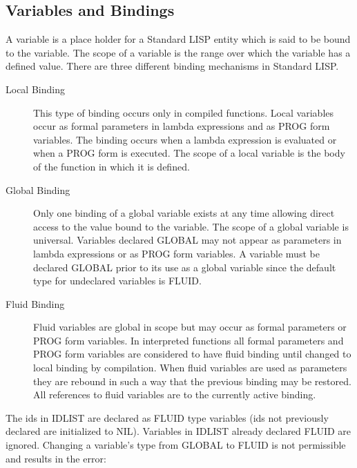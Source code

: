 \subsection{Variables and Bindings}
\label{varsandbinds}
 
A variable is a place holder for a Standard LISP entity which is said
to be bound to the variable. The scope of a variable is the range over
which the variable has a defined value. There are three different
binding mechanisms in Standard LISP.

\begin{description}
\item[Local Binding]  This type of binding occurs
only in compiled functions. Local variables occur as formal parameters
in lambda expressions and as PROG form variables. The binding occurs
when a lambda expression is evaluated or when a PROG form is executed.
The scope of a local variable is the body of the function in which it
is defined.

\item[Global Binding]  Only one binding of a
global variable exists at any time allowing direct access to the value
bound to the variable.  The scope of a global variable is universal.
Variables declared GLOBAL may not appear as parameters in lambda
expressions or as PROG form variables. A variable must be declared
GLOBAL prior to its use as a global variable since the default type
for undeclared variables is FLUID.


\item[Fluid Binding] 
 Fluid variables are global
in scope but may occur as  formal parameters or
PROG form variables. In interpreted functions all formal parameters
and PROG form variables are considered to have fluid binding until
changed to local binding by compilation.  When fluid variables are
used as parameters they are rebound in such a way that the previous
binding may be restored. All references to fluid variables are to the
currently active binding.
\end{description}


{The ids in IDLIST are declared as FLUID type variables (ids not
previously declared are initialized to NIL). Variables in IDLIST
already declared FLUID are ignored. Changing a variable's type from
GLOBAL to FLUID is not permissible and results in the error:

}

